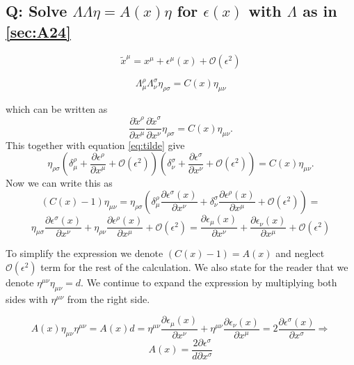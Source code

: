 \subsection{Q: Solve $\Lambda\Lambda\eta=A(x)\eta$ for $\epsilon(x)$ with $\Lambda$ as in \ref{sec:A24} }

\begin{equation}
\tilde{x} ^\mu=x^\mu+\epsilon^\mu (x)+ \mathcal{O}(\epsilon^2)
\label{eq:tilde}
\end{equation}



\begin{equation}
\Lambda^\rho _\mu \Lambda ^\sigma _\nu \eta_{\rho \sigma}=C(x) \eta_{\mu \nu}
\label{eq:orgin}
\end{equation}

which can be written as
$$
\frac{\partial \tilde{x}^\rho}{\partial x^\mu} \frac{\partial \tilde{x}^\sigma}{\partial x^\nu} \eta_{\rho \sigma}=C(x) \eta_{\mu \nu}. 
$$
This together with equation \ref{eq:tilde} give
\[
\eta_{\rho \sigma}(\delta^\rho _\mu + \frac{\partial \epsilon ^\rho}{\partial x^\mu}+\mathcal{O}(\epsilon^2))(\delta^\sigma _\nu + \frac{\partial \epsilon ^\sigma}{\partial x^\nu}+\mathcal{O}(\epsilon^2))=C(x) \eta_{\mu \nu}.
\]
Now we can write this as
\[
(C(x)-1)\eta_{\mu \nu}=\eta_{\rho \sigma}(\delta^\rho _\mu \frac{\partial \epsilon ^\sigma (x)}{\partial x^\nu}+\delta^\sigma _\nu \frac{\partial \epsilon ^\rho (x)}{\partial x^\mu}+\mathcal{O}(\epsilon^2))=
\] 
\[
\eta_{\mu \sigma}\frac{\partial \epsilon^\sigma (x) }{\partial x^\nu}+
\eta_{\rho \nu}\frac{\partial \epsilon^\rho (x) }{\partial x^\mu}+\mathcal{O}(\epsilon^2)
=\frac{\partial \epsilon_\mu (x)}{\partial x^\nu}+\frac{\partial \epsilon_\nu (x)}{\partial x^\mu}+\mathcal{O}(\epsilon^2) \]

To simplify the expression we denote $(C(x)-1)=A(x)$ and neglect $\mathcal{O}(\epsilon^2)$ term for the rest of the calculation. 
We also state for the reader that we denote $\eta^{\mu \nu} \eta_{\mu \nu}=d$. 
We continue to expand the expression by multiplying both sides with $\eta^{\mu \nu}$ from the right side.

$$
A(x)\eta_{\mu \nu} \eta^{\mu \nu}=A(x)d= \eta^{\mu \nu}\frac{\partial \epsilon_\mu (x)}{\partial x^\nu}+\eta^{\mu \nu}\frac{\partial \epsilon_\nu (x)}{\partial x^\mu}=2\frac{\partial \epsilon ^\sigma (x)}{\partial x^\sigma} \Rightarrow
$$
$$
A(x)=\frac{2 \partial \epsilon ^\sigma}{d \partial x^\sigma }
$$


